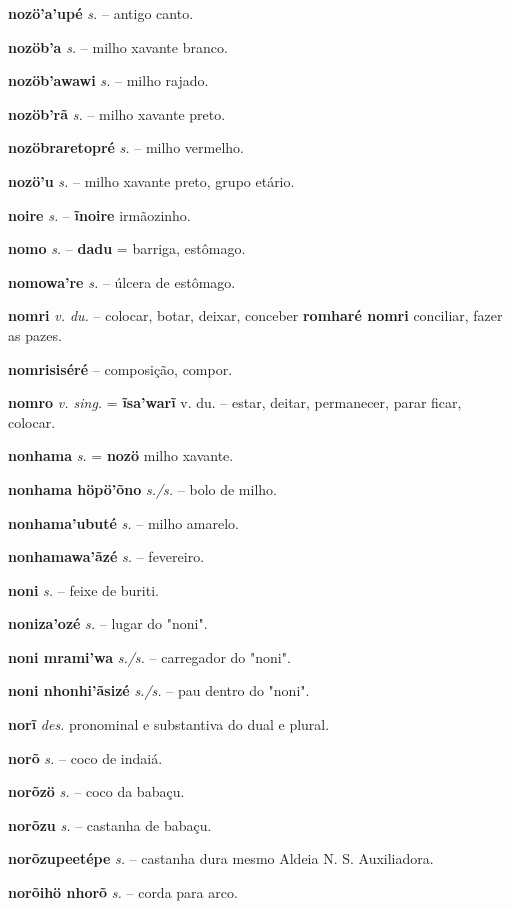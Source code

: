 \textbf{nozö'a'upé} \textit{s.} -- antigo canto.

\textbf{nozöb'a} \textit{s.} -- milho xavante branco.

\textbf{nozöb'awawi} \textit{s.} -- milho rajado.

\textbf{nozöb'rã} \textit{s.} -- milho xavante preto.

\textbf{nozöbraretopré} \textit{s.} -- milho vermelho.

\textbf{nozö'u} \textit{s.} -- milho xavante preto, grupo etário.

\textbf{noire} \textit{s.} -- \textbf{ĩnoire} irmãozinho.

\textbf{nomo} \textit{s.} -- \textbf{dadu} = barriga, estômago.

\textbf{nomowa're} \textit{s.} -- úlcera de estômago.

\textbf{nomri} \textit{v. du.} -- colocar, botar, deixar, conceber  \textbf{romharé nomri} conciliar, fazer as pazes.

\textbf{nomrisiséré} -- composição, compor.

\textbf{nomro} \textit{v. sing.} = \textbf{ĩsa'warĩ} v. du. -- estar, deitar, permanecer, parar ficar, colocar.

\textbf{nonhama} \textit{s.} = \textbf{nozö} milho xavante.

\textbf{nonhama höpö'õno} \textit{s./s.} -- bolo de milho.

\textbf{nonhama'ubuté} \textit{s.} -- milho amarelo.

\textbf{nonhamawa'ãzé} \textit{s.} -- fevereiro.

\textbf{noni} \textit{s.} -- feixe de buriti.

\textbf{noniza'ozé} \textit{s.} -- lugar do "noni".

\textbf{noni mrami'wa} \textit{s./s.} -- carregador do "noni".

\textbf{noni nhonhi'ãsizé} \textit{s./s.} -- pau dentro do "noni".

\textbf{norĩ} \textit{des.} pronominal e substantiva do dual e plural.

\textbf{norõ} \textit{s.} -- coco de indaiá.

\textbf{norõzö} \textit{s.} -- coco da babaçu.

\textbf{norõzu} \textit{s.} -- castanha de babaçu.

\textbf{norõzupeetépe} \textit{s.} -- castanha dura mesmo  Aldeia N. S. Auxiliadora.

\textbf{norõihö nhorõ} \textit{s.} -- corda para arco.

